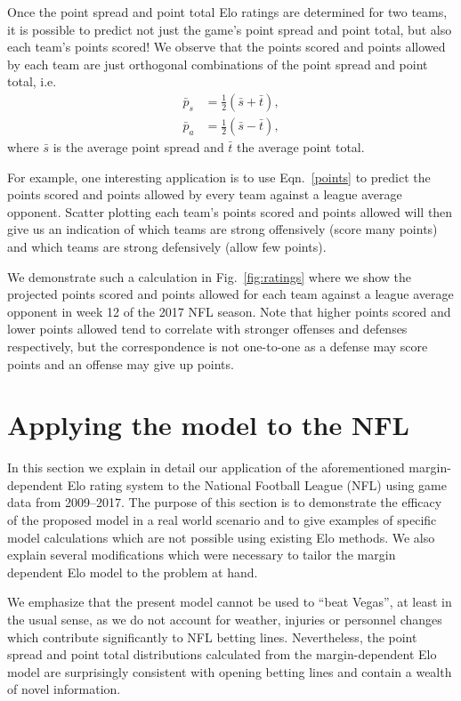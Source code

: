 \documentclass[aps,prc,reprint,amsmath,superscriptaddress]{revtex4-1}
\begin{document}
Once the point spread and point total Elo ratings are determined for two teams, it is possible to predict not just the game's point spread and point total, but also each team's points scored!
We observe that the points scored and points allowed by each team are just orthogonal combinations of the point spread and point total, i.e.\
\begin{align}
  \bar{p}_s &= \tfrac{1}{2}(\bar{s} + \bar{t}),\nonumber \\
  \bar{p}_a &= \tfrac{1}{2}(\bar{s} - \bar{t}),
  \label{points}
\end{align}
where $\bar{s}$ is the average point spread and $\bar{t}$ the average point total.

For example, one interesting application is to use Eqn.~\eqref{points} to predict the points scored and points allowed by every team against a league average opponent.
Scatter plotting each team's points scored and points allowed will then give us an indication of which teams are strong offensively (score many points) and which teams are strong defensively (allow few points).

We demonstrate such a calculation in Fig.~\ref{fig:ratings} where we show the projected points scored and points allowed for each team against a league average opponent in week 12 of the 2017 NFL season.
Note that higher points scored and lower points allowed tend to correlate with stronger offenses and defenses respectively, but the correspondence is not one-to-one as a defense may score points and an offense may give up points.

\section{Applying the model to the NFL}

In this section we explain in detail our application of the aforementioned margin-dependent Elo rating system to the National Football League (NFL) using game data from 2009--2017.
The purpose of this section is to demonstrate the efficacy of the proposed model in a real world scenario and to give examples of specific model calculations which are not possible using existing Elo methods.
We also explain several modifications which were necessary to tailor the margin dependent Elo model to the problem at hand.

We emphasize that the present model cannot be used to ``beat Vegas'', at least in the usual sense, as we do not account for weather, injuries or personnel changes which contribute significantly to NFL betting lines.
Nevertheless, the point spread and point total distributions calculated from the margin-dependent Elo model are surprisingly consistent with opening betting lines and contain a wealth of novel information.
\end{document}
